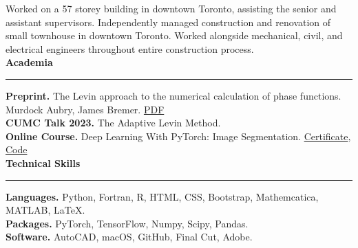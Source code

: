 \documentclass{article}
\begin{document}
\begin{spacing}{1.2}
Worked on a 57 storey building in downtown Toronto, assisting the senior and assistant supervisors.
Independently managed construction and renovation of small townhouse in downtown Toronto.
Worked alongside mechanical, civil, and electrical engineers throughout entire construction process.\\[0.20cm]


\LARGE{\textbf{Academia}}\normalsize\\
\vspace{-0.2cm}
\noindent\rule{17cm}{0.7pt}

\textbf{Preprint.} The Levin approach to the numerical calculation of phase functions. Murdock Aubry, James Bremer.
\href{https://arxiv.org/pdf/2308.03288.pdf}{\color{blue}PDF}\\[0.10cm]

\textbf{CUMC Talk 2023.} The Adaptive Levin Method. \\[0.10cm]

\textbf{Online Course.} Deep Learning With PyTorch: Image Segmentation.
\href{https://coursera.org/share/af13e96fd8a6f4c130db6e4bed3a3f1e}{\color{blue}Certificate},
\href{https://colab.research.google.com/drive/10UfARsUTKQkb56pkxxvbH-zTucQkDJEw#scrollTo=seventh-seating}{\color{blue}Code}\\[0.20cm]

\LARGE{\textbf{Technical Skills}}\normalsize \\[0.10cm]
\vspace{-0.2cm}
\noindent\rule{17cm}{0.7pt}

\textbf{Languages.} Python, Fortran, R, HTML, CSS, Bootstrap, Mathemcatica, MATLAB, \LaTeX .\\[0.10cm]

\textbf{Packages.} PyTorch, TensorFlow, Numpy, Scipy, Pandas. \\[0.10cm]

\textbf{Software.} AutoCAD, macOS, GitHub, Final Cut, Adobe. \\[0.10cm]

\end{spacing}
\end{document}
